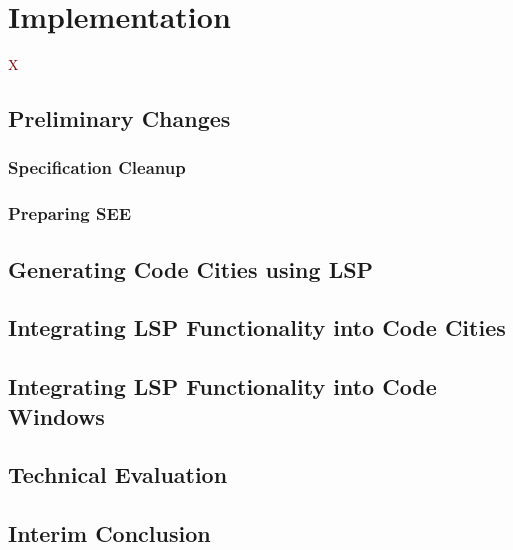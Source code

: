 \documentclass[../thesis]{subfiles}
\begin{document}
\chapter{Implementation}\label{ch:implementation}

\lettrine[lines=3]{\textcolor{Maroon}{X}}{} \fxfatal{}

\section{Preliminary Changes}
\fxfatal{}

\subsection{Specification Cleanup}
\fxfatal{}

\subsection{Preparing SEE}
\fxfatal{}

\section{Generating Code Cities using LSP}
\fxfatal{}

\section{Integrating LSP Functionality into Code Cities}
\fxfatal{}

\section{Integrating LSP Functionality into Code Windows}
\fxfatal{}

\section{Technical Evaluation}  %
\fxfatal{}

\section{Interim Conclusion}  %
\fxfatal{}
\end{document}
